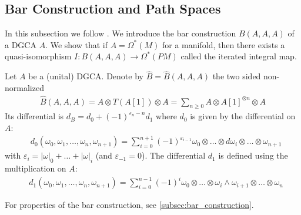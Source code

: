 \documentclass{scrartcl}
\let\emph\relax
\theoremstyle{plain}
\theoremstyle{definition}
\renewcommand{\epsilon}{\varepsilon}
\newcommand{\abs}[1]{\left\lvert#1\right\rvert}
\begin{document}
\subsection{Bar Construction and Path Spaces}\label{subsec:model-path-space}

In this subsection we follow \cite{naef2019string}. We introduce the bar construction $B(A, A, A)$ of a DGCA $A$. We show that if $A=\Omega^*(M)$ for a manifold, then there exists a quasi-isomorphism $I\colon B(A, A, A)\to \Omega^*(PM)$ called the iterated integral map. %

Let $A$ be a (unital) DGCA. Denote by $\hat B = \hat B(A, A, A)$ the two sided non-normalized \emph{bar construction}
\begin{align*}
    \hat B(A, A, A) = A\otimes T(A[1]) \otimes A = \sum_{n\geq 0} A\otimes A[1]^{\otimes n} \otimes A
\end{align*}
Its differential is $d_B = d_0 + (-1)^{\epsilon_n-n} d_1$ where $d_0$ is given by the differential on $A$:
\begin{align*}
    &d_0(\omega_0,\omega_1,\dots,\omega_n,\omega_{n+1}) = \sum_{i=0}^{n+1} (-1)^{\epsilon_{i-1}}\omega_0\otimes\dots\otimes d\omega_i \otimes\dots\otimes\omega_{n+1}
\end{align*}
with $\varepsilon_i = \abs\omega_0+\dots+\abs\omega_i$ (and $\epsilon_{-1} =0$). The differential $d_1$ is defined using the multiplication on $A$:
\begin{align*}
    &d_1(\omega_0,\omega_1,\dots,\omega_n,\omega_{n+1}) = \sum_{i=0}^{n-1}(-1)^{i}\omega_0\otimes \dots\otimes\omega_i\wedge\omega_{i+1}\otimes \dots\otimes \omega_{n}
\end{align*}

For properties of the bar construction, see \cref{subsec:bar_construction}. 
\end{document}
